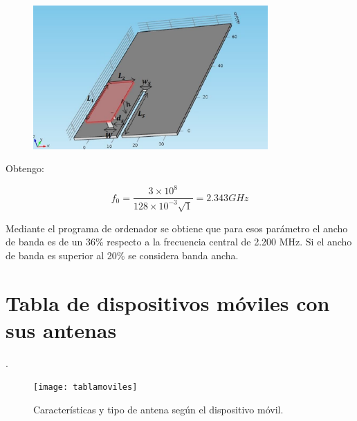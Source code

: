 \documentclass[a4paper,11pt,titlepage]{article}
\begin{document}
\begin{figure}[H]
\centering
\includegraphics[width=0.8\textwidth]{parametrosmulti}
\end{figure}
Obtengo: \par
$$f_0=\frac{3\times 10^{8}}{128 \times 10^{-3}\sqrt{1}}=2.343 GHz$$
\par
Mediante el programa de ordenador se obtiene que para esos parámetro el ancho de banda es de un 36\% respecto a la frecuencia central de 2.200 MHz. Si el ancho de banda es superior al 20\% se considera banda ancha.
\newpage
\section{Tabla de dispositivos móviles con sus antenas}.
\begin{figure}[H]
\centering
\texttt{[image: tablamoviles]}
\caption{Características y tipo de antena según el dispositivo móvil.}
\end{figure}

\end{document}
